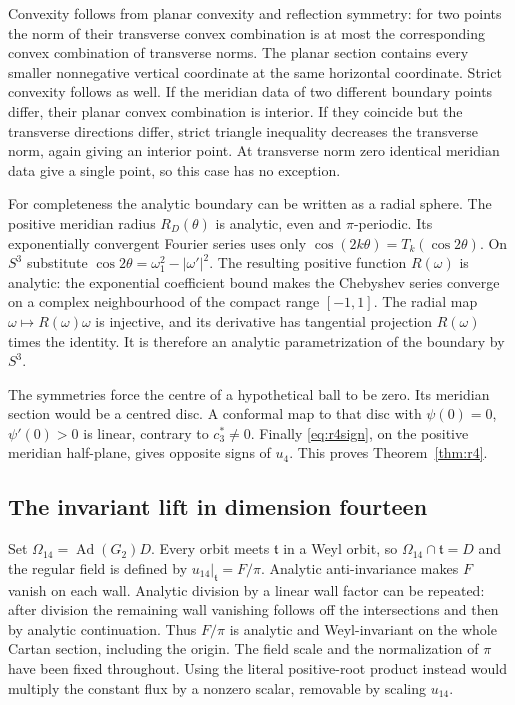 \documentclass[11pt]{amsart}
\theoremstyle{remark}
\numberwithin{equation}{section}
\newcommand{\Ad}{\operatorname{Ad}}
\newcommand{\tf}{\mathfrak t}
\begin{document}
Convexity follows from planar convexity and reflection symmetry:
for two points the norm of their transverse convex combination is at
most the corresponding convex combination of transverse norms.
The planar section contains every smaller nonnegative vertical
coordinate at the same horizontal coordinate. Strict convexity
follows as well. If the meridian data of two different boundary
points differ, their planar convex combination is interior. If they
coincide but the transverse directions differ, strict triangle
inequality decreases the transverse norm, again giving an interior
point. At transverse norm zero identical meridian data give a single
point, so this case has no exception.

For completeness the analytic boundary can be written as a radial
sphere. The positive meridian radius $R_D(\theta)$ is analytic,
even and $\pi$-periodic. Its exponentially convergent Fourier series
uses only $\cos(2k\theta)=T_k(\cos2\theta)$. On $S^3$ substitute
$\cos2\theta=\omega_1^2-|\omega'|^2$. The resulting positive function
$R(\omega)$ is analytic: the exponential coefficient bound makes the
Chebyshev series converge on a complex neighbourhood of the compact
range $[-1,1]$. The radial map $\omega\mapsto R(\omega)\omega$ is
injective, and its derivative has tangential projection
$R(\omega)$ times the identity. It is therefore an analytic
parametrization of the boundary by $S^3$.

The symmetries force the centre of a hypothetical ball to be zero.
Its meridian section would be a centred disc. A conformal map to that
disc with $\psi(0)=0$, $\psi'(0)>0$ is linear, contrary to
$c_3^*\ne0$. Finally \eqref{eq:r4sign}, on the positive meridian
half-plane, gives opposite signs of $u_4$. This proves
Theorem~\ref{thm:r4}.

\subsection{The invariant lift in dimension fourteen}
Set $\Omega_{14}=\Ad(G_2)D$. Every orbit meets $\tf$ in a Weyl orbit,
so $\Omega_{14}\cap\tf=D$ and the regular field is defined by
$u_{14}|_\tf=F/\pi$. Analytic anti-invariance makes $F$ vanish on each
wall. Analytic division by a linear wall factor can be repeated:
after division the remaining wall vanishing follows off the
intersections and then by analytic continuation. Thus $F/\pi$ is
analytic and Weyl-invariant on the whole Cartan section, including
the origin. The field scale and the normalization of $\pi$ have been
fixed throughout. Using the literal positive-root product instead
would multiply the constant flux by a nonzero scalar, removable by
scaling $u_{14}$.
\end{document}
